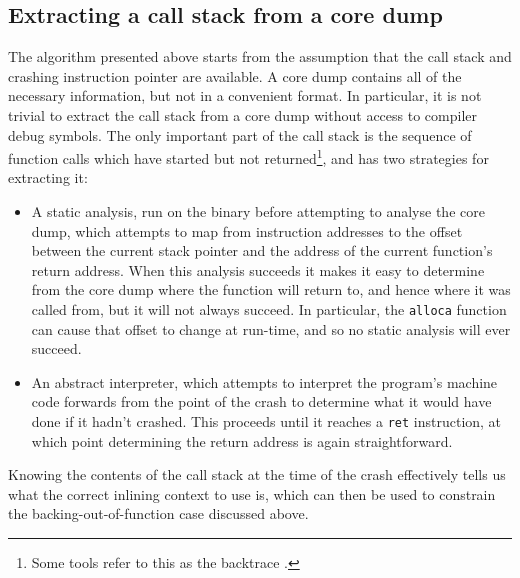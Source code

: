 

\subsection{Extracting a call stack from a core dump}

The algorithm presented above starts from the assumption that the call
stack and crashing instruction pointer are available.  A core dump
contains all of the necessary information, but not in a convenient
format.  In particular, it is not trivial to extract the call stack
from a core dump without access to compiler debug symbols.  The only
important part of the call stack is the sequence of function calls
which have started but not returned\footnote{Some tools refer to this
  as the backtrace .}, and {\technique} has two strategies
for extracting it:

\begin{itemize}
\item
  A static analysis, run on the binary before attempting to analyse
  the core dump, which attempts to map from instruction addresses to
  the offset between the current stack pointer and the address of the
  current function's return address.  When this analysis succeeds it
  makes it easy to determine from the core dump where the function
  will return to, and hence where it was called from, but it will not
  always succeed.  In particular, the \verb|alloca| function can cause
  that offset to change at run-time, and so no static analysis will
  ever succeed.
\item
  An abstract interpreter, which attempts to interpret the program's
  machine code forwards from the point of the crash to determine what
  it would have done if it hadn't crashed.  This proceeds until it
  reaches a \verb|ret| instruction, at which point determining the
  return address is again straightforward.
\end{itemize}


Knowing the contents of the call stack at the time of the crash
effectively tells us what the correct inlining context to use is,
which can then be used to constrain the backing-out-of-function case
discussed above.

